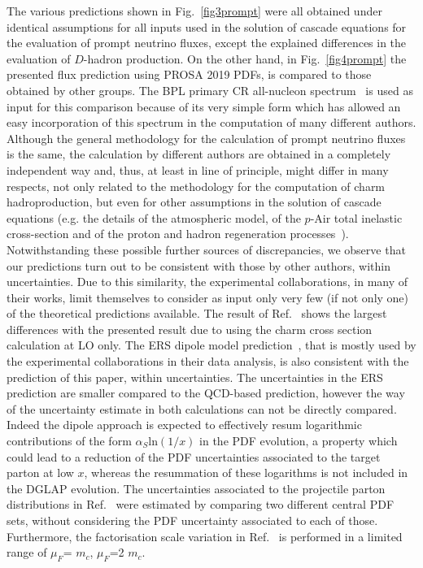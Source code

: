 \documentclass[12pt]{article}
\begin{document}
The various predictions shown in Fig.~\ref{fig3prompt} were all obtained under identical assumptions for all inputs used in the solution of cascade equations for the evaluation of prompt neutrino fluxes, except the explained differences in the evaluation of $D$-hadron production. On the other hand, in Fig.~\ref{fig4prompt} the presented flux prediction using PROSA 2019 PDFs, is compared to those obtained by other groups. The BPL primary CR all-nucleon spectrum~\cite{Gaisser:2016uoy} is used as input for this comparison because of its very simple form which has allowed an easy incorporation of this spectrum in the computation of many different authors. Although the general methodology for the calculation of prompt neutrino fluxes is the same, the calculation by different authors are obtained in a completely independent way and, thus, at least in line of principle, might differ in many respects, not only related to the methodology for the computation of charm hadroproduction, but even for other assumptions in the solution of cascade equations (e.g. the details of the atmospheric model, of the $p$-Air total inelastic cross-section and of the proton and hadron regeneration processes~\cite{Garzelli:2015psa}). Notwithstanding these possible further sources of discrepancies, we observe that our predictions turn out to be consistent with those by other authors, within uncertainties. Due to this similarity, the experimental collaborations, in many of their works, limit themselves to consider as input only very few (if not only one) of the theoretical predictions available. The result of Ref.~\cite{Gondolo:1995fq} shows the largest differences with the presented result due to using the charm cross section calculation at LO only. The ERS dipole model prediction~\cite{Enberg:2008te}, that is mostly used by the experimental collaborations in their data analysis, is also consistent with the prediction of this paper, within uncertainties. The uncertainties in the ERS prediction are smaller compared to the QCD-based prediction, however the way of the uncertainty estimate in both calculations can not be directly compared. Indeed the dipole approach is expected to effectively resum logarithmic contributions of the form $\alpha_S\mathrm{ln}(1/x)$ in the PDF evolution, a property which could lead to a reduction of the PDF uncertainties associated to the target parton at low $x$, whereas the resummation of these logarithms is not included in the DGLAP evolution.
The uncertainties associated to the projectile parton distributions in Ref.~\cite{Enberg:2008te} were estimated by comparing two different central PDF sets, without considering the PDF uncertainty associated to each of those. Furthermore, the factorisation scale variation in Ref.~\cite{Enberg:2008te} is performed in a limited range of $\mu_F$= $m_c$, $\mu_F$=2 $m_c$.
\end{document}
